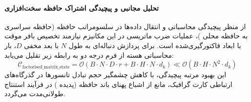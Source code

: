 \paragraph{تحلیل مجانبی و پیچیدگی اشتراک حافظه سخت‌افزاری}
از منظر پیچیدگی محاسباتی و انتقال داده‌ها در سلسومراتب حافظه (حافظه سراسری  به حافظه محلی )، عملیات ضرب ماتریسی در این مکانیزم نیازمند تخصیص بافر موقت با ابعاد فاکتورگیری‌شده است. برای پردازش دنباله‌ای به طول $N$ با بعد مخفی $D$، بار محاسباتی هسته از فرم درجه دو به رابطه زیر تقلیل می‌یابد:
\begin{equation}
\label{eq:complexity_factorised_matrix_state}
\mathcal{C}_{\text{factorised\_matrix\_state}} = \mathcal{O}\left( B \cdot N \cdot D \cdot r + B \cdot H \cdot N \cdot d_k \right) \ll \mathcal{O}\left( B \cdot H \cdot N^2 \cdot d_k \right)
\end{equation}
این بهبود مرتبه پیچیدگی، با کاهش چشمگیر حجم تبادل تانسورها در گذرگاه‌های ارتباطی کارت گرافیک، مانع از اشباع پهنای باند حافظه (پدیده ) در فرآیند استنتاج طولانی‌مدت می‌گردد.
